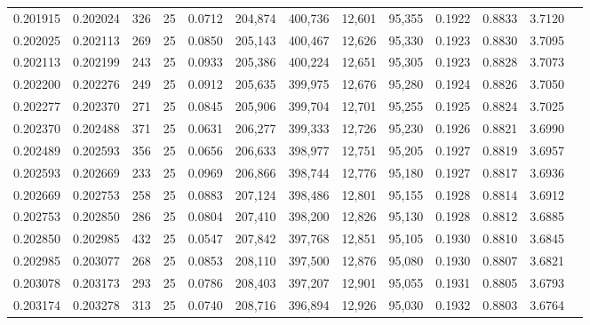 \begin{tabular}{rrrrrrrrrrrrr}
0.201915 & 0.202024 &   326 &  25 &                                     0.0712 & 204,874 & 400,736 &  12,601 &  95,355 & 0.1922 & 0.8833 & 3.7120 \\
0.202025 & 0.202113 &   269 &  25 &                                     0.0850 & 205,143 & 400,467 &  12,626 &  95,330 & 0.1923 & 0.8830 & 3.7095 \\
0.202113 & 0.202199 &   243 &  25 &                                     0.0933 & 205,386 & 400,224 &  12,651 &  95,305 & 0.1923 & 0.8828 & 3.7073 \\
0.202200 & 0.202276 &   249 &  25 &                                     0.0912 & 205,635 & 399,975 &  12,676 &  95,280 & 0.1924 & 0.8826 & 3.7050 \\
0.202277 & 0.202370 &   271 &  25 &                                     0.0845 & 205,906 & 399,704 &  12,701 &  95,255 & 0.1925 & 0.8824 & 3.7025 \\
0.202370 & 0.202488 &   371 &  25 &                                     0.0631 & 206,277 & 399,333 &  12,726 &  95,230 & 0.1926 & 0.8821 & 3.6990 \\
0.202489 & 0.202593 &   356 &  25 &                                     0.0656 & 206,633 & 398,977 &  12,751 &  95,205 & 0.1927 & 0.8819 & 3.6957 \\
0.202593 & 0.202669 &   233 &  25 &                                     0.0969 & 206,866 & 398,744 &  12,776 &  95,180 & 0.1927 & 0.8817 & 3.6936 \\
0.202669 & 0.202753 &   258 &  25 &                                     0.0883 & 207,124 & 398,486 &  12,801 &  95,155 & 0.1928 & 0.8814 & 3.6912 \\
0.202753 & 0.202850 &   286 &  25 &                                     0.0804 & 207,410 & 398,200 &  12,826 &  95,130 & 0.1928 & 0.8812 & 3.6885 \\
0.202850 & 0.202985 &   432 &  25 &                                     0.0547 & 207,842 & 397,768 &  12,851 &  95,105 & 0.1930 & 0.8810 & 3.6845 \\
0.202985 & 0.203077 &   268 &  25 &                                     0.0853 & 208,110 & 397,500 &  12,876 &  95,080 & 0.1930 & 0.8807 & 3.6821 \\
0.203078 & 0.203173 &   293 &  25 &                                     0.0786 & 208,403 & 397,207 &  12,901 &  95,055 & 0.1931 & 0.8805 & 3.6793 \\
0.203174 & 0.203278 &   313 &  25 &                                     0.0740 & 208,716 & 396,894 &  12,926 &  95,030 & 0.1932 & 0.8803 & 3.6764 \\

\end{tabular}
